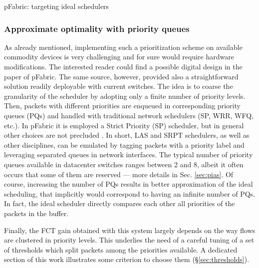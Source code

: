 \begin{subsection}{pFabric: targeting ideal schedulers}
 \subsubsection{Approximate optimality with priority queues}
As already mentioned, implementing such a prioritization scheme on available commodity devices is very challenging and for sure would require hardware modifications. The interested reader could find a possible digital design in the paper of pFabric. The same source, however, provided also a straightforward solution readily deployable with current switches. The idea is to coarse the granularity of the scheduler by adopting only a finite number of priority levels. Then, packets with different priorities are enqueued in corresponding priority queues (PQs) and handled with traditional network schedulers (SP, WRR, WFQ, etc.). In pFabric it is employed a Strict Priority (SP) scheduler, but in general other choices are not precluded \cite{mqecn}. In short, LAS and SRPT schedulers, as well as other disciplines, can be emulated by tagging packets with a priority label and leveraging separated queues in network interfaces. The typical number of priority queues available in datacenter switches ranges between 2 and 8, albeit it often occurs that some of them are reserved --- more details in Sec. \ref{sec:pias}. Of course, increasing the number of PQs results in better approximation of the ideal scheduling, that implicitly would correspond to having an infinite number of PQs. In fact, the ideal scheduler directly compares each other all priorities of the packets in the buffer.

Finally, the FCT gain obtained with this system largely depends on the way flows are clustered in priority levels. This underlies the need of a careful tuning of a set of thresholds which split packets among the priorities available. A dedicated section of this work illustrates some criterion to choose them (\S \ref{sec:thresholds}). 

\end{subsection}

